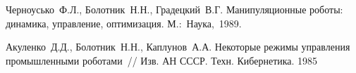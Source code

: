 



%

%

\begin{thebibliography}{9} %

 Черноусько~Ф.Л., Болотник~Н.Н., Градецкий~В.Г. Манипуляционные роботы: динамика, управление, оптимизация. М.:~Наука,~1989.

 Акуленко~Д.Д., Болотник~Н.Н., Каплунов~А.А. Некоторые режимы управления промышленными роботами~// Изв. АН СССР. Техн. Кибернетика. 1985







\end{thebibliography}





%

